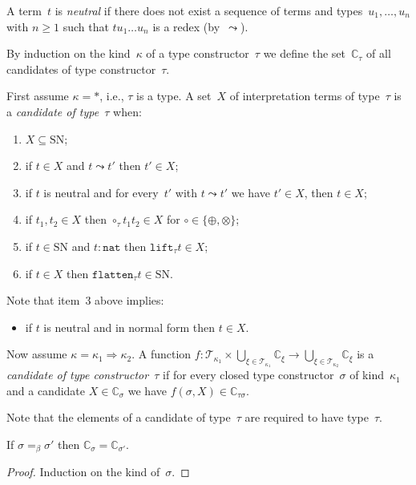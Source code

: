 \documentclass[runningheads,a4paper]{llncs}
\newcommand{\arrkind}{\Rightarrow}
\newcommand{\Tc}{\mathcal{T}}
\newcommand{\nat}{\mathtt{nat}}
\newcommand{\flatten}{\mathtt{flatten}}
\newcommand{\lift}{\mathtt{lift}}
\newcommand{\SN}{\mathrm{SN}}
\newcommand{\Cb}{\mathbb{C}}
\begin{document}
\begin{definition}\label{def_candidate}\normalfont
  A term~$t$ is \emph{neutral} if there does not exist a sequence of
  terms and types~$u_1,\ldots,u_n$ with $n \ge 1$ such that $t u_1
  \ldots u_n$ is a redex (by~$\leadsto$).

  By induction on the kind~$\kappa$ of a type constructor~$\tau$ we
  define the set~$\Cb_\tau$ of all candidates of type
  constructor~$\tau$.

  First assume $\kappa=*$, i.e., $\tau$ is a type. A set~$X$ of
  interpretation terms of type~$\tau$ is a \emph{candidate of
    type~$\tau$} when:
  \begin{enumerate}
  \item $X \subseteq \SN$;
  \item if $t \in X$ and $t \leadsto t'$ then $t' \in X$;
  \item if $t$ is neutral and for every~$t'$ with $t \leadsto t'$ we
    have $t' \in X$, then $t \in X$;
  \item if $t_1,t_2 \in X$ then $\circ_\tau t_1 t_2 \in X$ for
    $\circ \in \{\oplus,\otimes\}$;
  \item if $t \in \SN$ and $t : \nat$ then $\lift_\tau t \in X$;
  \item if $t \in X$ then $\flatten_\tau t \in \SN$.
  \end{enumerate}
  Note that item~3 above implies:
  \begin{itemize}
  \item if $t$ is neutral and in normal form then $t \in X$.
  \end{itemize}

  Now assume $\kappa = \kappa_1\arrkind\kappa_2$. A function $f :
  \Tc_{\kappa_1} \times \bigcup_{\xi\in\Tc_{\kappa_1}}\Cb_\xi \to
  \bigcup_{\xi\in\Tc_{\kappa_2}}\Cb_\xi$ is a \emph{candidate of type
    constructor~$\tau$} if for every closed type constructor~$\sigma$
  of kind~$\kappa_1$ and a candidate $X \in \Cb_\sigma$ we have
  $f(\sigma,X) \in \Cb_{\tau\sigma}$.
\end{definition}

Note that the elements of a candidate of type~$\tau$ are required to
have type~$\tau$.

\begin{lemma}\label{lem_beta_candidate}
  If $\sigma =_\beta \sigma'$ then $\Cb_\sigma = \Cb_{\sigma'}$.
\end{lemma}

\begin{proof}
  Induction on the kind of~$\sigma$.
\end{proof}
\end{document}
